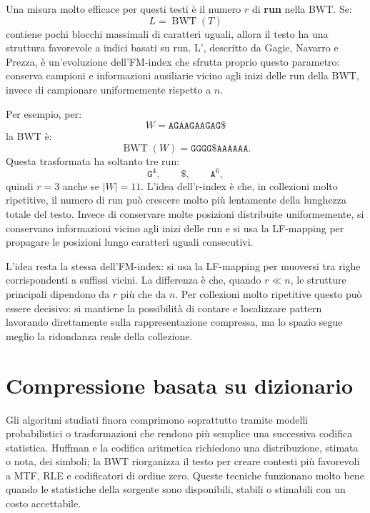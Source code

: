 \documentclass{article}
\theoremstyle{definition}
\numberwithin{equation}{section}
\begin{document}
Una misura molto efficace per questi testi è il numero $r$ di \textbf{run} nella BWT. Se:
\[
    L=\operatorname{BWT}(T)
\]
contiene pochi blocchi massimali di caratteri uguali, allora il testo ha una struttura favorevole a indici basati su run. L'\textbf{}, descritto da Gagie, Navarro e Prezza, è un'evoluzione dell'FM-index che sfrutta proprio questo parametro: conserva campioni e informazioni ausiliarie vicino agli inizi delle run della BWT, invece di campionare uniformemente rispetto a $n$.

Per esempio, per:
\[
    W=\texttt{AGAAGAAGAG\$}
\]
la BWT è:
\[
    \operatorname{BWT}(W)=\texttt{GGGG\$AAAAAA}.
\]
Questa trasformata ha soltanto tre run:
\[
    \texttt{G}^4,
    \qquad
    \texttt{\$},
    \qquad
    \texttt{A}^6,
\]
quindi $r=3$ anche se $|W|=11$. L'idea dell'r-index è che, in collezioni molto ripetitive, il numero di run può crescere molto più lentamente della lunghezza totale del testo. Invece di conservare molte posizioni distribuite uniformemente, si conservano informazioni vicino agli inizi delle run e si usa la LF-mapping per propagare le posizioni lungo caratteri uguali consecutivi.

L'idea resta la stessa dell'FM-index: si usa la LF-mapping per muoversi tra righe corrispondenti a suffissi vicini. La differenza è che, quando $r\ll n$, le strutture principali dipendono da $r$ più che da $n$. Per collezioni molto ripetitive questo può essere decisivo: si mantiene la possibilità di contare e localizzare pattern lavorando direttamente sulla rappresentazione compressa, ma lo spazio segue meglio la ridondanza reale della collezione.
























\section{Compressione basata su dizionario}
Gli algoritmi studiati finora comprimono soprattutto tramite modelli probabilistici o trasformazioni che rendono più semplice una successiva codifica statistica. Huffman e la codifica aritmetica richiedono una distribuzione, stimata o nota, dei simboli; la BWT riorganizza il testo per creare contesti più favorevoli a MTF, RLE e codificatori di ordine zero. Queste tecniche funzionano molto bene quando le statistiche della sorgente sono disponibili, stabili o stimabili con un costo accettabile.
\end{document}
